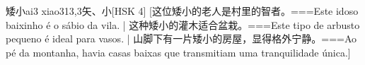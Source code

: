 \begin{EntryWithPhonetic}{矮小}{ai3 xiao3}{13,3}{⽮、⼩}[HSK 4]
  [这位矮小的老人是村里的智者。===Este idoso baixinho é o sábio da vila. | 这种矮小的灌木适合盆栽。===Este tipo de arbusto pequeno é ideal para vasos. | 山脚下有一片矮小的房屋，显得格外宁静。===Ao pé da montanha, havia casas baixas que transmitiam uma tranquilidade única.]
\end{EntryWithPhonetic}
